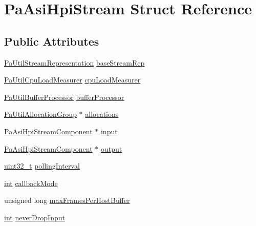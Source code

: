 \hypertarget{struct_pa_asi_hpi_stream}{}\section{Pa\+Asi\+Hpi\+Stream Struct Reference}
\label{struct_pa_asi_hpi_stream}
\subsection*{Public Attributes}
\begin{DoxyCompactItemize}
\item 
\hyperlink{struct_pa_util_stream_representation}{Pa\+Util\+Stream\+Representation} \hyperlink{struct_pa_asi_hpi_stream_a9c4b93e3228c1659e33f1f48d269c849}{base\+Stream\+Rep}
\item 
\hyperlink{struct_pa_util_cpu_load_measurer}{Pa\+Util\+Cpu\+Load\+Measurer} \hyperlink{struct_pa_asi_hpi_stream_af369ced5674ff0a5f622a1b58232bfc4}{cpu\+Load\+Measurer}
\item 
\hyperlink{struct_pa_util_buffer_processor}{Pa\+Util\+Buffer\+Processor} \hyperlink{struct_pa_asi_hpi_stream_a80292f716701b4bd9ba52e27dea4d00c}{buffer\+Processor}
\item 
\hyperlink{struct_pa_util_allocation_group}{Pa\+Util\+Allocation\+Group} $\ast$ \hyperlink{struct_pa_asi_hpi_stream_a73f6f13ff2d5dd03ef5df9946b5d9f5f}{allocations}
\item 
\hyperlink{struct_pa_asi_hpi_stream_component}{Pa\+Asi\+Hpi\+Stream\+Component} $\ast$ \hyperlink{struct_pa_asi_hpi_stream_a5c0b414b7ab1b1f2fef8fa5512a1e944}{input}
\item 
\hyperlink{struct_pa_asi_hpi_stream_component}{Pa\+Asi\+Hpi\+Stream\+Component} $\ast$ \hyperlink{struct_pa_asi_hpi_stream_aafbaf53953d492ea86a8a80159860974}{output}
\item 
\hyperlink{lib-src_2ffmpeg_2win32_2stdint_8h_a6eb1e68cc391dd753bc8ce896dbb8315}{uint32\+\_\+t} \hyperlink{struct_pa_asi_hpi_stream_aef07ecb3b6d4d1dcb1669d4e3925ebdb}{polling\+Interval}
\item 
\hyperlink{xmltok_8h_a5a0d4a5641ce434f1d23533f2b2e6653}{int} \hyperlink{struct_pa_asi_hpi_stream_a9ec09a8e74639bef0acf580cb33f9a35}{callback\+Mode}
\item 
unsigned long \hyperlink{struct_pa_asi_hpi_stream_abcaf386b2ddf78d402841682d6b9ff2c}{max\+Frames\+Per\+Host\+Buffer}
\item 
\hyperlink{xmltok_8h_a5a0d4a5641ce434f1d23533f2b2e6653}{int} \hyperlink{struct_pa_asi_hpi_stream_a4310add2bc6454a4a9a2aeede23a4fea}{never\+Drop\+Input}

\end{DoxyCompactItemize}
